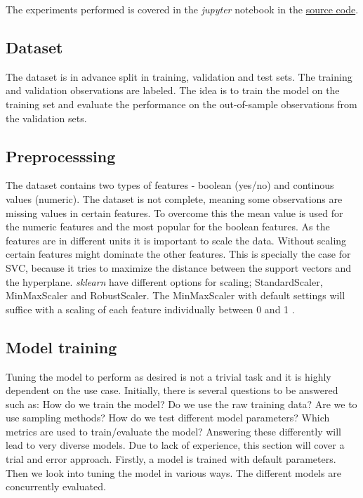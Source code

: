 The experiments performed is covered in the \textit{jupyter} notebook in the \href{https://github.com/mlRosenquist/au-mlr-computer-vision-and-ml/tree/master/project/notebook.ipynb}{source code}.

\subsection{Dataset}
The dataset is in advance split in training, validation and test sets. The training and validation observations are labeled. The idea is to train the model on the training set and evaluate the performance on the out-of-sample observations from the validation sets.  

\subsection{Preprocesssing}
The dataset contains two types of features - boolean (yes/no) and continous values (numeric). The dataset is not complete, meaning some observations are missing values in certain features. To overcome this the mean value is used for the numeric features and the most popular for the boolean features. As the features are in different units it is important to scale the data. Without scaling certain features might dominate the other features. This is specially the case for SVC, because it tries to maximize the distance between the support vectors and the hyperplane. \textit{sklearn} have different options for scaling; StandardScaler, MinMaxScaler and RobustScaler. The MinMaxScaler with default settings will suffice with a scaling of each feature individually between 0 and 1 .        

\subsection{Model training}
Tuning the model to perform as desired is not a trivial task and it is highly dependent on the use case. Initially, there is several questions to be answered such as: How do we train the model? Do we use the raw training data? Are we to use sampling methods? How do we test different model parameters? Which metrics are used to train/evaluate the model? Answering these differently will lead to very diverse models. Due to lack of experience, this section will cover a trial and error approach. Firstly, a model is trained with default parameters. Then we look into tuning the model in various ways. The different models are concurrently evaluated. \\

